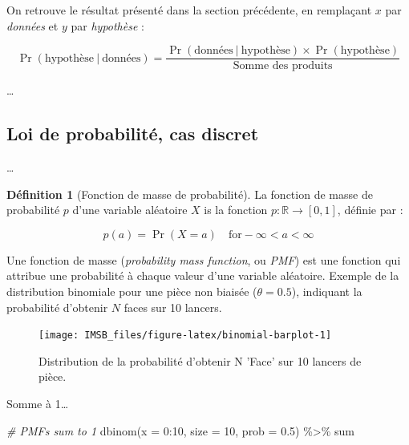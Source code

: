 \documentclass[
  a4paper,11pt,twoside,onecolumn,openright,final,oldfontcommands]{memoir}
\newenvironment{Shaded}{\begin{snugshade}}{\end{snugshade}}
\newcommand{\AttributeTok}[1]{\textcolor[rgb]{0.77,0.63,0.00}{#1}}
\newcommand{\CommentTok}[1]{\textcolor[rgb]{0.56,0.35,0.01}{\textit{#1}}}
\newcommand{\DecValTok}[1]{\textcolor[rgb]{0.00,0.00,0.81}{#1}}
\newcommand{\FloatTok}[1]{\textcolor[rgb]{0.00,0.00,0.81}{#1}}
\newcommand{\FunctionTok}[1]{\textcolor[rgb]{0.00,0.00,0.00}{#1}}
\newcommand{\NormalTok}[1]{#1}
\newcommand{\SpecialCharTok}[1]{\textcolor[rgb]{0.00,0.00,0.00}{#1}}
\theoremstyle{definition}
\newtheorem{definition}{Définition}[chapter]
\theoremstyle{definition}
\theoremstyle{definition}
\theoremstyle{definition}
\theoremstyle{remark}
\begin{document}
On retrouve le résultat présenté dans la section précédente, en remplaçant \(x\) par \emph{données} et \(y\) par \emph{hypothèse} :

\[
\Pr(\text{hypothèse} \ | \ \text{données}) = \frac{\Pr(\text{données} \ | \ \text{hypothèse}) \times \Pr(\text{hypothèse})}{\text{Somme des produits}}
\]

\ldots{}

\hypertarget{loi-de-probabilituxe9-cas-discret}{%
\subsection{Loi de probabilité, cas discret}\label{loi-de-probabilituxe9-cas-discret}}

\ldots{}

\begin{definition}[Fonction de masse de probabilité]
\protect\hypertarget{def:PMF}{}\label{def:PMF}La fonction de masse de probabilité \(p\) d'une variable aléatoire \(X\) is la fonction \(p : \mathbb{R} \rightarrow [0, 1]\), définie par :

\[p(a) = \Pr(X = a) \quad \text{for} - \infty < a < \infty\]
\end{definition}

Une fonction de masse (\emph{probability mass function}, ou \emph{PMF}) est une fonction qui attribue une probabilité à chaque valeur d'une variable aléatoire. Exemple de la distribution binomiale pour une pièce non biaisée (\(\theta = 0.5\)), indiquant la probabilité d'obtenir \(N\) faces sur 10 lancers.

\begin{figure}[!htb]

{\centering \texttt{[image: IMSB\_files/figure-latex/binomial-barplot-1]} 

}

\caption{Distribution de la probabilité d'obtenir N 'Face' sur 10 lancers de pièce.}\label{fig:binomial-barplot}
\end{figure}

Somme à 1\ldots{}

\begin{Shaded}
\begin{Highlighting}[]
\CommentTok{\# PMFs sum to 1}
\FunctionTok{dbinom}\NormalTok{(}\AttributeTok{x =} \DecValTok{0}\SpecialCharTok{:}\DecValTok{10}\NormalTok{, }\AttributeTok{size =} \DecValTok{10}\NormalTok{, }\AttributeTok{prob =} \FloatTok{0.5}\NormalTok{) }\SpecialCharTok{\%\textgreater{}\%}\NormalTok{ sum}
\end{Highlighting}
\end{Shaded}
\end{document}

